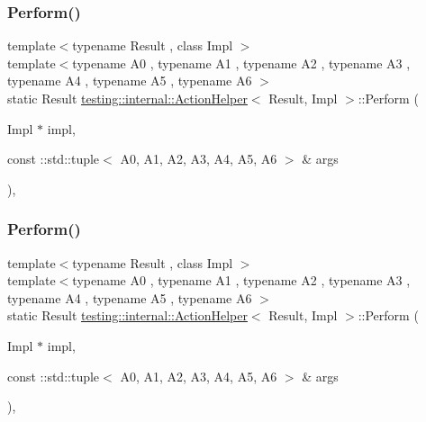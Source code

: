 \mbox{\label{classtesting_1_1internal_1_1_action_helper_a6746053e045bcd9c1ba85061d2872bb5}} 
\subsubsection{\texorpdfstring{Perform()}{Perform()}\hspace{0.1cm}{\footnotesize\ttfamily [15/33]}}
{\footnotesize\ttfamily template$<$typename Result , class Impl $>$ \\
template$<$typename A0 , typename A1 , typename A2 , typename A3 , typename A4 , typename A5 , typename A6 $>$ \\
static Result \mbox{\hyperlink{classtesting_1_1internal_1_1_action_helper}{testing\+::internal\+::\+Action\+Helper}}$<$ Result, Impl $>$\+::Perform (\begin{DoxyParamCaption}\item[{Impl $\ast$}]{impl,  }\item[{const \+::std\+::tuple$<$ A0, A1, A2, A3, A4, A5, A6 $>$ \&}]{args }\end{DoxyParamCaption})\hspace{0.3cm}{\ttfamily [inline]}, {\ttfamily [static]}}

\mbox{\label{classtesting_1_1internal_1_1_action_helper_a6746053e045bcd9c1ba85061d2872bb5}} 
\subsubsection{\texorpdfstring{Perform()}{Perform()}\hspace{0.1cm}{\footnotesize\ttfamily [16/33]}}
{\footnotesize\ttfamily template$<$typename Result , class Impl $>$ \\
template$<$typename A0 , typename A1 , typename A2 , typename A3 , typename A4 , typename A5 , typename A6 $>$ \\
static Result \mbox{\hyperlink{classtesting_1_1internal_1_1_action_helper}{testing\+::internal\+::\+Action\+Helper}}$<$ Result, Impl $>$\+::Perform (\begin{DoxyParamCaption}\item[{Impl $\ast$}]{impl,  }\item[{const \+::std\+::tuple$<$ A0, A1, A2, A3, A4, A5, A6 $>$ \&}]{args }\end{DoxyParamCaption})\hspace{0.3cm}{\ttfamily [inline]}, {\ttfamily [static]}}

